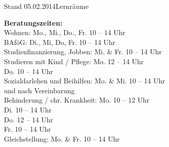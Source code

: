 \documentclass[10pt]{article}
\begin{document}
\begin{rueckseite}{Stand 05.02.2014}{Lernr\"aume}
{\begin{minipage}[b]{0.993\linewidth}
{{\raggedright{\textbf{\footnotesize Beratungszeiten:}}\\
\scriptsize
Wohnen:                         \hfill{}Mo., Mi., Do., Fr. 10\Uhr{} -- 14\Uhr{} Uhr                     \hspace*{1ex}\\

BAföG:                        \hfill{}Di., Mi, Do, Fr. 10\Uhr{} -- 14\Uhr{} Uhr             \hspace*{1ex}\\

Studienfinanzierung, Jobben:           \hfill{}Mi. \& Fr. 10\Uhr{} -- 14\Uhr{} Uhr             \hspace*{1ex}\\

Studieren mit Kind / Pflege:            \hfill{}Mo. 12\Uhr{} -- 14\Uhr{} Uhr                    \hspace*{1ex}\\
                                \hfill{}Do. 10\Uhr{} -- 14\Uhr{} Uhr                    \hspace*{1ex}\\

Sozialdarlehen und Beihilfen:   \hfill{}Mo. \& Mi. 10\Uhr{} -- 14\Uhr{} Uhr             \hspace*{1ex}\\
                                \hfill und nach Vereinbarung                            \hspace*{1ex}\\

Behinderung / chr. Krankheit:   \hfill{}Mo. 10\Uhr{} -- 12\Uhr{} Uhr                    \hspace*{1ex}\\
                                \hfill{}Di. 10\Uhr{} -- 14\Uhr{} Uhr                    \hspace*{1ex}\\
                                \hfill{}Do. 12\Uhr{} -- 14\Uhr{} Uhr                    \hspace*{1ex}\\
                                \hfill{}Fr. 10\Uhr{} -- 14\Uhr{} Uhr                    \hspace*{1ex}\\

Gleichstellung:                \hfill{}Mo. \& Fr. 10\Uhr{} -- 14\Uhr{} Uhr               \hspace*{1ex}\\

}}
\end{minipage}}
\end{rueckseite}
\end{document}
